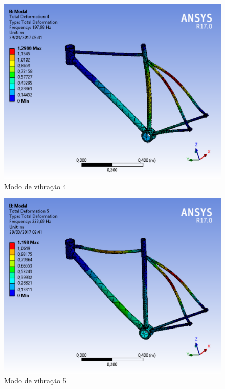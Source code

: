 \graphicspath{{figuras/}}
	\begin{figure}[h!]
	\centering
	\includegraphics[scale=0.80]{modo_de_vibracao_4.png}
	\caption{Modo de vibração 4}
	\label{img:modo_de_vibracao4}
	\end{figure}	
	
\graphicspath{{figuras/}}
	\begin{figure}[h!]
	\centering
	\includegraphics[scale=0.80]{modo_de_vibracao_5.png}
	\caption{Modo de vibração 5}
	\label{img:modo_de_vibracao5}
	\end{figure}	

